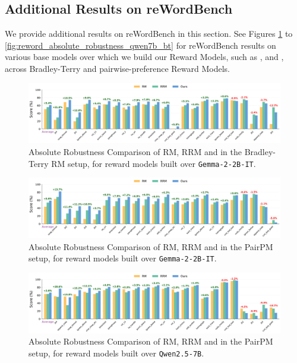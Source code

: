 \subsection{Additional Results on reWordBench}
We provide additional results on reWordBench in this section. See Figures \ref{fig:reword_absolute_robustness_gemma2b_bt} to \ref{fig:reword_absolute_robustness_qwen7b_bt} for reWordBench results on various base models over which we build our Reward Models, such as ,  and \qwen{}, across Bradley-Terry and pairwise-preference Reward Models.

\begin{figure}[!htpb]
  \centering
  \includegraphics[width=0.9\columnwidth]{images/reword_absolute_robustness_gemma2b_bt_sorted.pdf}
  \caption{Absolute Robustness Comparison of RM, RRM and \carma{} in the Bradley-Terry RM setup, for reward models built over \texttt{Gemma-2-2B-IT}.}
  \label{fig:reword_absolute_robustness_gemma2b_bt}
  
\end{figure}

\begin{figure}[!htpb]
  \centering
  \includegraphics[width=0.9\columnwidth]{images/reword_absolute_robustness_gemma2b_pairpm_sorted.pdf}
  \caption{Absolute Robustness Comparison of RM, RRM and \carma{} in the PairPM setup, for reward models built over \texttt{Gemma-2-2B-IT}.}
  \label{fig:reword_absolute_robustness_gemma2b_pairpm}
  
\end{figure}

\begin{figure}[!htpb]
  \centering
  \includegraphics[width=0.9\columnwidth]{images/reword_absolute_robustness_qwen7b_pairpm_sorted.pdf}
  \caption{Absolute Robustness Comparison of RM, RRM and \carma{} in the PairPM setup, for reward models built over \texttt{Qwen2.5-7B}.}
  \label{fig:reword_absolute_robustness_qwen7b_pairpm}
  
\end{figure}

